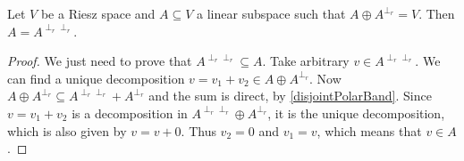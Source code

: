 \begin{proposition}
Let $V$ be a Riesz space and $A\subseteq V$ a linear subspace such that $A\oplus A^{\perp_r} = V$. Then $A = A^{\perp_r\perp_r}$.
\end{proposition}
\begin{proof}
We just need to prove that $A^{\perp_r\perp_r} \subseteq A$. Take arbitrary $v\in A^{\perp_r\perp_r}$. We can find a unique decomposition $v= v_1+v_2 \in A\oplus A^{\perp_r}$. Now $A\oplus A^{\perp_r} \subseteq A^{\perp_r\perp_r}+ A^{\perp_r}$ and the sum is direct, by \ref{disjointPolarBand}. Since $v= v_1+v_2$ is a decomposition in $A^{\perp_r\perp_r}\oplus A^{\perp_r}$, it is the unique decomposition, which is also given by $v= v+0$. Thus $v_2 = 0$ and $v_1 = v$, which means that $v\in A$.
\end{proof}

